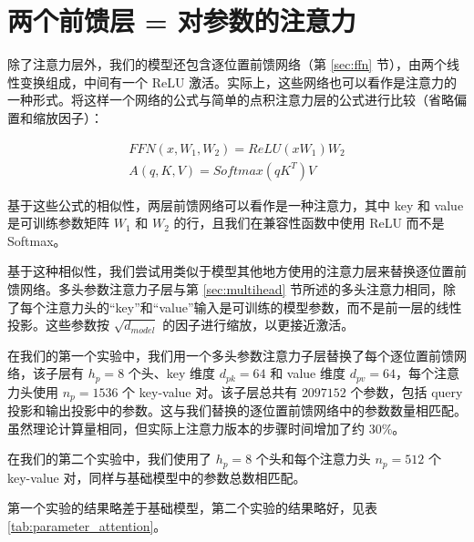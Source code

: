\pagebreak
\section*{两个前馈层 = 对参数的注意力}\label{sec:parameter_attention}

除了注意力层外，我们的模型还包含逐位置前馈网络（第 \ref{sec:ffn} 节），由两个线性变换组成，中间有一个 ReLU 激活。实际上，这些网络也可以看作是注意力的一种形式。将这样一个网络的公式与简单的点积注意力层的公式进行比较（省略偏置和缩放因子）：

\begin{align*}
    FFN(x, W_1, W_2) = ReLU(xW_1)W_2 \\
    A(q, K, V) = Softmax(qK^T)V
\end{align*}

基于这些公式的相似性，两层前馈网络可以看作是一种注意力，其中 key 和 value 是可训练参数矩阵 $W_1$ 和 $W_2$ 的行，且我们在兼容性函数中使用 ReLU 而不是 Softmax。


基于这种相似性，我们尝试用类似于模型其他地方使用的注意力层来替换逐位置前馈网络。多头参数注意力子层与第 \ref{sec:multihead} 节所述的多头注意力相同，除了每个注意力头的``key''和``value''输入是可训练的模型参数，而不是前一层的线性投影。这些参数按 $\sqrt{d_{model}}$ 的因子进行缩放，以更接近激活。

在我们的第一个实验中，我们用一个多头参数注意力子层替换了每个逐位置前馈网络，该子层有 $h_p=8$ 个头、key 维度 $d_{pk}=64$ 和 value 维度 $d_{pv}=64$，每个注意力头使用 $n_p=1536$ 个 key-value 对。该子层总共有 $2097152$ 个参数，包括 query 投影和输出投影中的参数。这与我们替换的逐位置前馈网络中的参数数量相匹配。虽然理论计算量相同，但实际上注意力版本的步骤时间增加了约 30\%。

在我们的第二个实验中，我们使用了 $h_p=8$ 个头和每个注意力头 $n_p=512$ 个 key-value 对，同样与基础模型中的参数总数相匹配。

第一个实验的结果略差于基础模型，第二个实验的结果略好，见表 \ref{tab:parameter_attention}。

